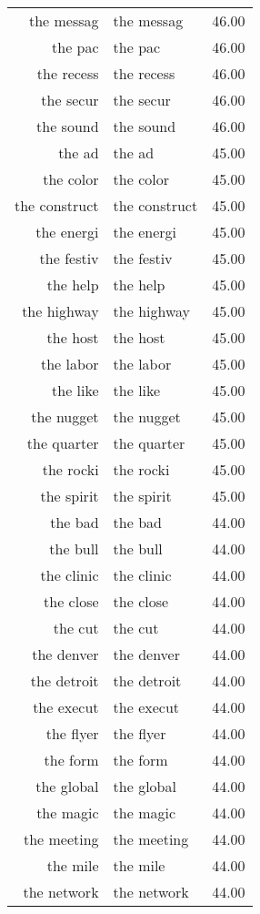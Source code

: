\begin{table}[ht]
\begin{tabular}{rlr}
  the messag & the messag & 46.00 \\ 
  the pac & the pac & 46.00 \\ 
  the recess & the recess & 46.00 \\ 
  the secur & the secur & 46.00 \\ 
  the sound & the sound & 46.00 \\ 
  the ad & the ad & 45.00 \\ 
  the color & the color & 45.00 \\ 
  the construct & the construct & 45.00 \\ 
  the energi & the energi & 45.00 \\ 
  the festiv & the festiv & 45.00 \\ 
  the help & the help & 45.00 \\ 
  the highway & the highway & 45.00 \\ 
  the host & the host & 45.00 \\ 
  the labor & the labor & 45.00 \\ 
  the like & the like & 45.00 \\ 
  the nugget & the nugget & 45.00 \\ 
  the quarter & the quarter & 45.00 \\ 
  the rocki & the rocki & 45.00 \\ 
  the spirit & the spirit & 45.00 \\ 
  the bad & the bad & 44.00 \\ 
  the bull & the bull & 44.00 \\ 
  the clinic & the clinic & 44.00 \\ 
  the close & the close & 44.00 \\ 
  the cut & the cut & 44.00 \\ 
  the denver & the denver & 44.00 \\ 
  the detroit & the detroit & 44.00 \\ 
  the execut & the execut & 44.00 \\ 
  the flyer & the flyer & 44.00 \\ 
  the form & the form & 44.00 \\ 
  the global & the global & 44.00 \\ 
  the magic & the magic & 44.00 \\ 
  the meeting & the meeting & 44.00 \\ 
  the mile & the mile & 44.00 \\ 
  the network & the network & 44.00 \\ 

\end{tabular}
\end{table}
